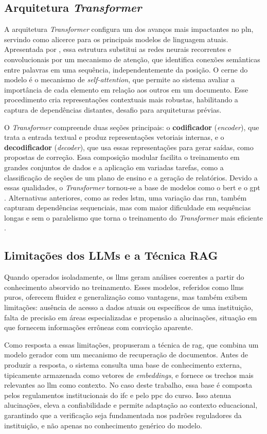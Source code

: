 \subsection{Arquitetura \textit{Transformer}}
A arquitetura \textit{Transformer} configura um dos avanços mais impactantes no \gls{pln}, servindo como alicerce para os principais modelos de linguagem atuais. Apresentada por , essa estrutura substitui as redes neurais recorrentes e convolucionais por um mecanismo de atenção, que identifica conexões semânticas entre palavras em uma sequência, independentemente da posição. O cerne do modelo é o mecanismo de \textit{self-attention}, que permite ao sistema avaliar a importância de cada elemento em relação aos outros em um documento. Esse procedimento cria representações contextuais mais robustas, habilitando a captura de dependências distantes, desafio para arquiteturas prévias.

O \textit{Transformer} compreende duas seções principais: o \textbf{codificador} (\textit{encoder}), que trata a entrada textual e produz representações vetoriais internas, e o \textbf{decodificador} (\textit{decoder}), que usa essas representações para gerar saídas, como propostas de correção. Essa composição modular facilita o treinamento em grandes conjuntos de dados e a aplicação em variadas tarefas, como a classificação de seções de um plano de ensino e a geração de relatórios. Devido a essas qualidades, o \textit{Transformer} tornou-se a base de modelos como o \gls{bert} e o \gls{gpt} \cite{Vaswani2017}. Alternativas anteriores, como as redes \gls{lstm}, uma variação das \gls{rnn}, também capturam dependências sequenciais, mas com maior dificuldade em sequências longas e sem o paralelismo que torna o treinamento do \textit{Transformer} mais eficiente \cite{Vaswani2017}.

\subsection{Limitações dos LLMs e a Técnica RAG}
Quando operados isoladamente, os \glspl{llm} geram análises coerentes a partir do conhecimento absorvido no treinamento. Esses modelos, referidos como \glspl{llm} puros, oferecem fluidez e generalização como vantagens, mas também exibem limitações: ausência de acesso a dados atuais ou específicos de uma instituição, falta de precisão em áreas especializadas e propensão a alucinações, situação em que fornecem informações errôneas com convicção aparente.

Como resposta a essas limitações,  propuseram a técnica de \gls{rag}, que combina um modelo gerador com um mecanismo de recuperação de documentos. Antes de produzir a resposta, o sistema consulta uma base de conhecimento externa, tipicamente armazenada como vetores de \textit{embeddings}, e fornece os trechos mais relevantes ao \gls{llm} como contexto. No caso deste trabalho, essa base é composta pelos regulamentos institucionais do \gls{ifc} e pelo \gls{ppc} do curso. Isso atenua alucinações, eleva a confiabilidade e permite adaptação ao contexto educacional, garantindo que a verificação seja fundamentada nos padrões reguladores da instituição, e não apenas no conhecimento genérico do modelo.

